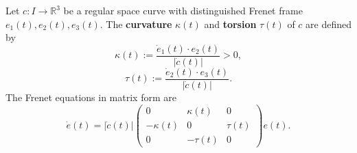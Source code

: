 Let $c: I \to \mathbb{R}^3$ be a regular space curve with distinguished Frenet frame $e_1(t), e_2(t), e_3(t)$. The \textbf{curvature} $\kappa(t)$ and \textbf{torsion} $\tau(t)$ of $c$ are defined by
$$\kappa(t) := \frac{\dot{e}_1(t) \cdot e_2(t)}{|\dot{c}(t)|} > 0,$$
$$\tau(t) := \frac{\dot{e}_2(t) \cdot e_3(t)}{|\dot{c}(t)|}.$$
The Frenet equations in matrix form are
$$\dot{e}(t) = |\dot{c}(t)| \begin{pmatrix} 0 & \kappa(t) & 0 \\ -\kappa(t) & 0 & \tau(t) \\ 0 & -\tau(t) & 0 \end{pmatrix} e(t).$$
